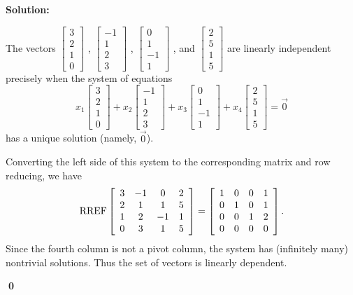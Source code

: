 \documentclass{article}
\newenvironment{solution}
{
  \ignorespaces
  \textbf{Solution:}
}
{
  \ignorespacesafterend
  \begin{flushright}
  {\bfseries \qed}
  \end{flushright}
}
\begin{document}
\begin{solution}
The vectors 
\( \begin{bmatrix} 3 \\ 2 \\ 1 \\ 0 \end{bmatrix} \) ,
\( \begin{bmatrix} -1 \\ 1 \\ 2 \\ 3 \end{bmatrix} \) ,
\( \begin{bmatrix} 0 \\ 1 \\ -1 \\ 1 \end{bmatrix} \) , and
\( \begin{bmatrix} 2 \\ 5 \\ 1 \\ 5 \end{bmatrix} \) are linearly independent precisely when the system of equations 
\[ x_1\begin{bmatrix} 3 \\ 2 \\ 1 \\ 0 \end{bmatrix} +
 x_2\begin{bmatrix} -1 \\ 1 \\ 2 \\ 3 \end{bmatrix} +
 x_3\begin{bmatrix} 0 \\ 1 \\ -1 \\ 1 \end{bmatrix}+ 
 x_4\begin{bmatrix} 2 \\ 5 \\ 1 \\ 5 \end{bmatrix} =\vec{0}\]
has a unique solution (namely, \(\vec{0}\)). 

Converting the left side of this system to the corresponding matrix and row reducing, we have
\[\operatorname{RREF} \left[\begin{array}{cccc} 3 & -1 & 0 & 2  \\ 2 & 1 & 1 & 5  \\ 1 & 2 & -1 & 1  \\ 0 & 3 & 1 & 5 \end{array}\right] =
\left[\begin{array}{cccc} 1 & 0 & 0 & 1  \\ 0 & 1 & 0 & 1  \\ 0 & 0 & 1 & 2  \\ 0 & 0 & 0 & 0  \end{array}\right].\] 
Since the fourth column is not a pivot column, the system has (infinitely many) nontrivial solutions.
Thus the set of vectors is linearly dependent.
\end{solution}
\end{document}
